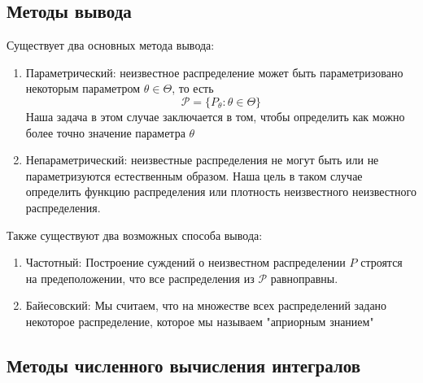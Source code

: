 \documentclass[a4paper,12pt]{article}
\theoremstyle{named}
\begin{document}
\subsection{Методы вывода}
Существует два основных метода вывода:
\begin{enumerate}
    \item Параметрический: неизвестное распределение может быть параметризовано некоторым параметром $\theta \in \Theta$, то есть 
    $$
        \mathcal{P} = \{P_\theta : \theta \in \Theta\}
    $$
    Наша задача в этом случае заключается в том, чтобы определить как можно 
    более точно значение параметра $\theta$
    \item Непараметрический: неизвестные распределения не могут быть или не параметризуются естественным образом. Наша цель в таком 
    случае определить функцию распределения или плотность неизвестного неизвестного распределения.
\end{enumerate}
Также существуют два возможных способа вывода:
\begin{enumerate}
    \item Частотный: Построение суждений о неизвестном распределении $P$ строятся на предеположении, что все распределения из 
    $\mathcal{P}$ равноправны. 
    \item Байесовский: Мы считаем, что на множестве всех распределений задано некоторое распределение, которое мы называем 
    "априорным знанием" 
\end{enumerate}
\subsection{Методы численного вычисления интегралов}
\end{document}
